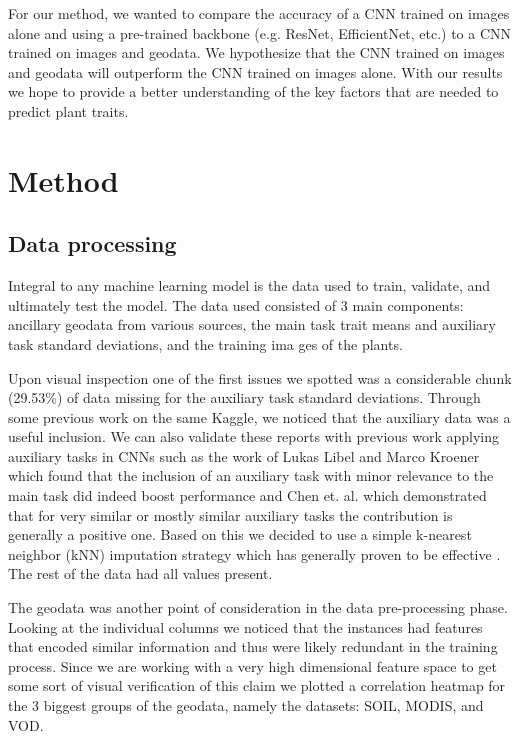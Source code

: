 \documentclass[12pt,a4paper,oneside]{article}
\begin{document}
\smallskip
For our method, we wanted to compare the accuracy of a CNN trained on images alone and using a pre-trained backbone (e.g. ResNet, EfficientNet, etc.) to a CNN trained on images and geodata. We hypothesize that the CNN trained on images and geodata will outperform the CNN trained on images alone. With our results we hope to provide a better understanding of the key factors that are needed to predict plant traits.


\section{Method}

\subsection{Data processing}

Integral to any machine learning model is the data used to train, validate, and ultimately test the model. The data used consisted of 3 main components: ancillary geodata from various sources, the main task trait means and auxiliary task standard deviations, and the training ima ges of the plants.

\smallskip 
Upon visual inspection one of the first issues we spotted was a considerable chunk (29.53\%) of data missing for the auxiliary task standard deviations. Through some previous work on the same Kaggle, we noticed that the auxiliary data was a useful inclusion. We can also validate these reports with previous work applying auxiliary tasks in CNNs such as the work of Lukas Libel and Marco Kroener which found that the inclusion of an auxiliary task with minor relevance to the main task did indeed boost performance \cite{lukaslibel} and Chen et. al. \cite{pmlr-v80-chen18a} which demonstrated that for very similar or mostly similar auxiliary tasks the contribution is generally a positive one. Based on this we decided to use a simple k-nearest neighbor (kNN) imputation strategy which has generally proven to be effective \cite{joel2024performance}. The rest of the data had all values present.

\smallskip
The geodata was another point of consideration in the data pre-processing phase. Looking at the individual columns we noticed that the instances had features that encoded similar information and thus were likely redundant in the training process. Since we are working with a very high dimensional feature space to get some sort of visual verification of this claim we plotted a correlation heatmap for the 3 biggest groups of the geodata, namely the datasets: SOIL, MODIS, and VOD.
\end{document}
